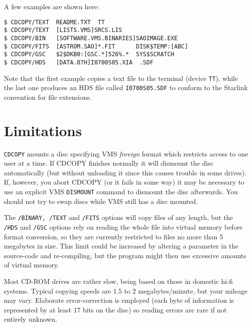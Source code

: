 A few examples are shown here: 
\begin{verbatim}
$ CDCOPY/TEXT  README.TXT  TT
$ CDCOPY/TEXT  [LISTS.VMS]SRCS.LIS
$ CDCOPY/BIN   [SOFTWARE.VMS.BINARIES]SAOIMAGE.EXE
$ CDCOPY/FITS  [ASTROM.SAO]*.FIT      DISK$TEMP:[ABC]
$ CDCOPY/GSC   $2$DKB0:[GSC.*]526%.*  SYS$SCRATCH
$ CDCOPY/HDS   [DATA.07H]I0700S05.XIA  .SDF
\end{verbatim}
Note that the first example copies a text file to the terminal (device
{\tt TT}), while the last one produces an HDS file called {\tt I0700S05.SDF} 
to conform to the Starlink convention for file extensions.

\section{Limitations}
{\tt CDCOPY} mounts a disc specifying VMS {\em foreign} format which
restricts access to one user at a time. If CDCOPY finishes normally it
will dismount the disc automatically (but without unloading it since
this causes trouble in some drives).  If, however, you abort CDCOPY
(or it fails in some way) it may be necessary to use an explicit VMS
{\tt DISMOUNT} command to dismount the disc afterwards.  You should not
try to swap discs while VMS still has a disc mounted. 

The {\tt /BINARY, /TEXT} and {\tt /FITS} options will copy files of any
length, but the {\tt /HDS} and {\tt /GSC} options rely on reading the
whole file into virtual memory before format conversion, so they are
currently restricted to files no more than 5 megabytes in size.  This 
limit could be increased by altering a parameter in the source-code and 
re-compiling, but the program might then use excessive amounts of
virtual memory. 

Most CD-ROM drives are rather slow, being based on those in domestic
hi-fi systems.  Typical copying speeds are 1.5 to 2 megabytes/minute, but
your mileage may vary. Elaborate error-correction is employed (each byte
of information is represented by at least 17 bits on the disc) so 
reading errors are rare if not entirely unknown.

 

